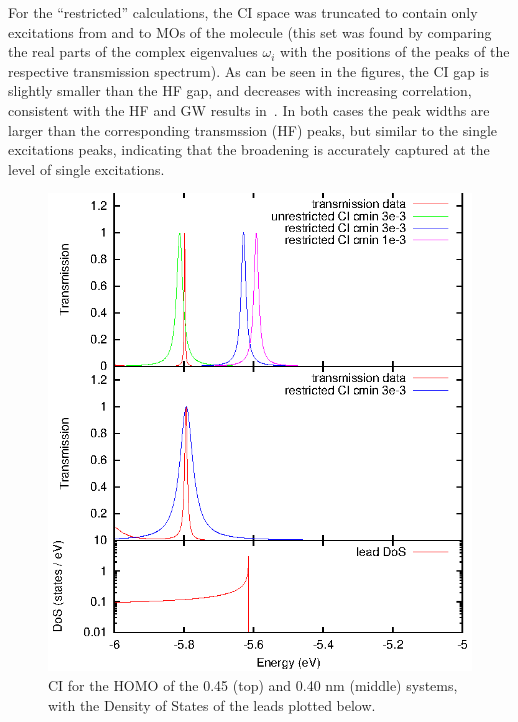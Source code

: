For the ``restricted'' calculations, the \ac{CI} space was truncated to contain
only excitations from and to MOs of the molecule (this set was found by
comparing the real parts of the complex eigenvalues $\omega_i$ with the
positions of the peaks of the respective transmission spectrum). As can be seen
in the figures, the \ac{CI} gap is slightly smaller than the HF gap, and
decreases with increasing correlation, consistent with the HF and GW
results in~\cite{thygesen_rubio, thygesenrubio2010corr}. In both cases the peak
widths are larger than the corresponding transmssion (HF) peaks, but similar
to the single excitations peaks, indicating that the broadening is accurately
captured at the level of single excitations.

\begin{figure}
	\begin{center}
		\includegraphics[width=0.9\linewidth]{figures/cihomo.eps}
	\end{center}
	\caption{CI for the \ac{HOMO} of the 0.45 (top) and 0.40 nm (middle)
                 systems, with the Density of States of the leads plotted
                 below.}
	\label{fig:cihomo}
\end{figure}


